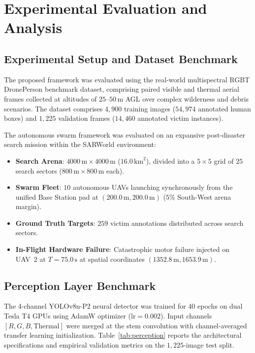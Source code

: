 \documentclass[conference]{IEEEtran}
\begin{document}
\section{Experimental Evaluation and Analysis}

\subsection{Experimental Setup and Dataset Benchmark}
The proposed framework was evaluated using the real-world multispectral RGBT DronePerson benchmark dataset, comprising paired visible and thermal aerial frames collected at altitudes of $25\text{--}50\,\text{m}$ AGL over complex wilderness and debris scenarios. The dataset comprises $4,900$ training images ($54,974$ annotated human boxes) and $1,225$ validation frames ($14,460$ annotated victim instances).

The autonomous swarm framework was evaluated on an expansive post-disaster search mission within the SARWorld environment:
\begin{itemize}
    \item \textbf{Search Arena}: $4000\,\text{m} \times 4000\,\text{m}$ ($16.0\,\text{km}^2$), divided into a $5 \times 5$ grid of $25$ search sectors ($800\,\text{m} \times 800\,\text{m}$ each).
    \item \textbf{Swarm Fleet}: $10$ autonomous UAVs launching synchronously from the unified Base Station pad at $(200.0\,\text{m}, 200.0\,\text{m})$ ($5\%$ South-West arena margin).
    \item \textbf{Ground Truth Targets}: $259$ victim annotations distributed across search sectors.
    \item \textbf{In-Flight Hardware Failure}: Catastrophic motor failure injected on UAV~2 at $T=75.0\,\text{s}$ at spatial coordinates $(1352.8\,\text{m}, 1653.9\,\text{m})$.
\end{itemize}

\subsection{Perception Layer Benchmark}
The 4-channel YOLOv8n-P2 neural detector was trained for 40 epochs on dual Tesla T4 GPUs using AdamW optimizer ($\text{lr} = 0.002$). Input channels $[R, G, B, \text{Thermal}]$ were merged at the stem convolution with channel-averaged transfer learning initialization. Table~\ref{tab:perception} reports the architectural specifications and empirical validation metrics on the $1,225$-image test split.
\end{document}
